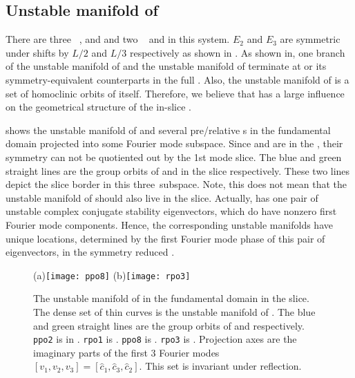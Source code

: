 \subsection{Unstable manifold of  }

There are three \eqva\  ,  and  and two
\reqva\  and  in this system.
$E_2$ and $E_3$ are symmetric under shifts by $L/2$ and
$L/3$ respectively as shown in .
As shown in, one branch of the unstable manifold of
 and the unstable manifold of  terminate at 
or its symmetry-equivalent counterparts in the full \statesp.
Also, the unstable manifold of  is a set of
homoclinic orbits of itself.
Therefore, we believe that
 has a large influence on the geometrical structure
of the in-slice \statesp.

 shows the unstable manifold of
 and several pre/relative \po s in the fundamental
domain projected into
some Fourier mode subspace. Since  and 
are in the {\sliceBord}, their  symmetry can not be
quotiented out by the 1st mode slice.
The blue and green straight lines are the group orbits of
 and  in the slice respectively. These
two lines depict the slice border in this three\dmn\ subspace.
Note, this does not mean that the unstable manifold of
 should also live in the slice. Actually, 
has one pair of unstable complex conjugate stability
eigenvectors, which
do have nonzero first Fourier mode components. Hence,
the corresponding unstable manifolds have unique locations,
determined by the first Fourier mode phase of this pair of
eigenvectors, in the symmetry reduced \statesp.

\begin{figure}[!ht]
  \centering
  (a)\texttt{[image: ppo8]}
  (b)\texttt{[image: rpo3]}
  \caption[The unstable manifold of .]{
    The unstable manifold of  in the fundamental domain in the
    slice.
    The dense set of thin curves is the unstable
    manifold of .
    The blue and green straight lines are the group orbits of
     and  respectively.
    \texttt{ppo2} is  in .
    \texttt{rpo1} is .
    \texttt{ppo8} is . \texttt{rpo3} is .
    Projection axes are the imaginary parts of the first 3 Fourier modes
    $[v_1, v_2, v_3] = [\hat{c}_1, \hat{c}_3, \hat{c}_2]$.
    This set is invariant under reflection.
  }
  \label{fig:E2Wu}
\end{figure}


